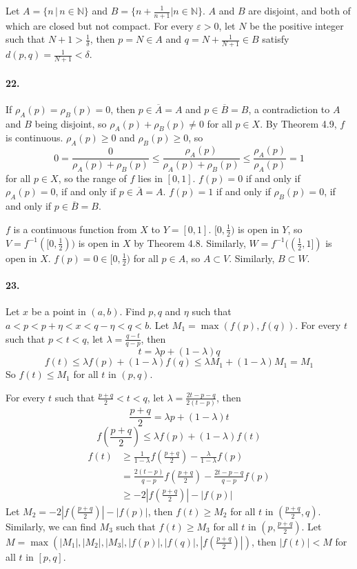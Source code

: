 \documentclass[a4paper]{article}
\begin{document}
Let $A=\{n\,|\,n\in \mathbb{N}\}$ and $B=\{n+\frac{1}{n+1}|n\in \mathbb{N}\}$.\; $A$ and $B$ are disjoint, and both of which are closed but not compact. For every $\varepsilon>0$, let $N$ be the positive integer such that $N+1>\frac{1}{\delta}$, then $p=N\in A$ and $q=N+\frac{1}{N+1}\in B$ satisfy $d(p,q)=\frac{1}{N+1}<\delta$.

\paragraph{22.}
If $\rho_A(p)=\rho_B(p)=0$, then $p\in\overline{A}=A$ and $p\in\overline{B}=B$, a contradiction to $A$ and $B$ being disjoint, so $\rho_A(p)+\rho_B(p)\neq0$ for all $p\in X$. By Theorem 4.9, $f$ is continuous. $\rho_A(p)\geq0$ and $\rho_B(p)\geq0$, so
\[
0=\frac{0}{\rho_A(p)+\rho_B(p)}\leq\frac{\rho_A(p)}{\rho_A(p)+\rho_B(p)}\leq\frac{\rho_A(p)}{\rho_A(p)}=1
\]
for all $p\in X$, so the range of $f$ lies in $[0,1]$.\; $f(p)=0$ if and only if $\rho_A(p)=0$, if and only if $p\in\overline{A}=A$.\; $f(p)=1$ if and only if $\rho_B(p)=0$, if and only if $p\in\overline{B}=B$.

$f$ is a continuous function from $X$ to $Y=[0,1]$.\; $[0,\frac{1}{2})$ is open in $Y$, so $V=f^{-1}([0,\frac{1}{2}))$ is open in $X$ by Theorem 4.8. Similarly, $W=f^{-1}((\frac{1}{2},1])$ is open in $X$.\; $f(p)=0\in[0,\frac{1}{2})$ for all $p\in A$, so $A\subset V$. Similarly, $B\subset W$.

\paragraph{23.}
Let $x$ be a point in $(a,b)$. Find $p,q$ and $\eta$ such that $a<p<p+\eta<x<q-\eta<q<b$. Let $M_1=\max(f(p),f(q))$. For every $t$ such that $p<t<q$, let $\lambda=\frac{q-t}{q-p}$, then 
\[
t=\lambda p+(1-\lambda)q
\]
\[
f(t)\leq \lambda f(p)+(1-\lambda)f(q)\leq \lambda M_1+(1-\lambda)M_1=M_1
\]
So $f(t)\leq M_1$ for all $t$ in $(p,q)$.

For every $t$ such that $\frac{p+q}{2}<t<q$, let $\lambda=\frac{2t-p-q}{2(t-p)}$, then
\[
\frac{p+q}{2}=\lambda p+(1-\lambda)t
\]
\[
f(\frac{p+q}{2})\leq \lambda f(p)+(1-\lambda)f(t)
\]
\begin{equation*}
    \begin{split}
        f(t) & \geq \frac{1}{1-\lambda}f(\frac{p+q}{2})-\frac{\lambda}{1-\lambda}f(p)\\
        & =\frac{2(t-p)}{q-p}f(\frac{p+q}{2})-\frac{2t-p-q}{q-p}f(p)\\
        & \geq -2\left|f(\frac{p+q}{2}) \right|-|f(p)|
    \end{split}
\end{equation*}
Let $M_2=-2\left|f(\frac{p+q}{2}) \right|-|f(p)|$, then $f(t)\geq M_2$ for all $t$ in $(\frac{p+q}{2},q)$. Similarly, we can find $M_3$ such that $f(t)\geq M_3$ for all $t$ in $(p,\frac{p+q}{2})$. Let $M=\max(|M_1|,|M_2|,|M_3|,|f(p)|,|f(q)|,|f(\frac{p+q}{2})|)$, then $|f(t)|<M$ for all $t$ in $[p,q]$.
\end{document}
